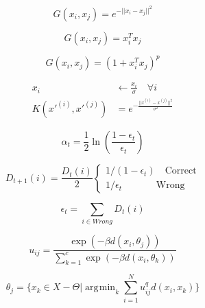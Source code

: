 \documentclass[a4paper]{article}
\DeclareMathOperator*{\argmin}{\arg\!\min}
\begin{document}
\begin{equation}
	G(x_i, x_j) = e^{-|| x_i-x_j ||^2}
\end{equation}

\begin{equation}
	G(x_i, x_j) = x_i^Tx_j
\end{equation}

\begin{equation}
	G(x_i, x_j) = (1+ x_i^T x_j)^p
\end{equation}

\begin{align}
	x_i &\gets \frac{x_i}{\sigma} \quad \forall i \\
	K(x'^{(i)}, x'^{(j)}) &= e^{-\frac{|| x^{(i)}-x^{(j)} ||^2}{\sigma ^2}}
\end{align}

\begin{equation}
	\alpha_t = \frac{1}{2}\ln\left(\frac{1-\epsilon_t}{\epsilon_t}\right)
\end{equation}

\begin{equation}
	D_{t+1}(i) = \frac{D_t(i)}{2}\begin{cases}
			1/(1-\epsilon_t) \quad \text{Correct} \\
			1/\epsilon_t \quad \quad \quad \;\; \text{Wrong}
		\end{cases}
\end{equation}

\begin{equation}
	\epsilon_t = \sum_{i \in Wrong} D_t(i)
\end{equation}

\begin{equation}
	u_{ij} = \frac{\exp(-\beta d(x_i, \theta_j))}{\sum_{k=1}^c \exp(-\beta d(x_i, \theta_k))}
\end{equation}

\begin{equation}
	\theta_j = \{x_k \in X-\Theta| \argmin_k \sum_{i=1}^N u_{ij}^q d(x_i, x_k)\}
\end{equation}
\end{document}

